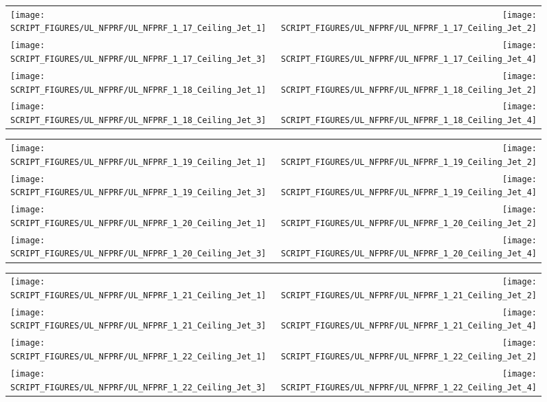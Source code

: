 \begin{figure}[!ht]
\begin{tabular*}{\textwidth}{l@{\extracolsep{\fill}}r}
\texttt{[image: SCRIPT\_FIGURES/UL\_NFPRF/UL\_NFPRF\_1\_17\_Ceiling\_Jet\_1]} &
\texttt{[image: SCRIPT\_FIGURES/UL\_NFPRF/UL\_NFPRF\_1\_17\_Ceiling\_Jet\_2]} \\
\texttt{[image: SCRIPT\_FIGURES/UL\_NFPRF/UL\_NFPRF\_1\_17\_Ceiling\_Jet\_3]} &
\texttt{[image: SCRIPT\_FIGURES/UL\_NFPRF/UL\_NFPRF\_1\_17\_Ceiling\_Jet\_4]} \\
\texttt{[image: SCRIPT\_FIGURES/UL\_NFPRF/UL\_NFPRF\_1\_18\_Ceiling\_Jet\_1]} &
\texttt{[image: SCRIPT\_FIGURES/UL\_NFPRF/UL\_NFPRF\_1\_18\_Ceiling\_Jet\_2]} \\
\texttt{[image: SCRIPT\_FIGURES/UL\_NFPRF/UL\_NFPRF\_1\_18\_Ceiling\_Jet\_3]} &
\texttt{[image: SCRIPT\_FIGURES/UL\_NFPRF/UL\_NFPRF\_1\_18\_Ceiling\_Jet\_4]}
\end{tabular*}
\end{figure}

\begin{figure}[!ht]
\begin{tabular*}{\textwidth}{l@{\extracolsep{\fill}}r}
\texttt{[image: SCRIPT\_FIGURES/UL\_NFPRF/UL\_NFPRF\_1\_19\_Ceiling\_Jet\_1]} &
\texttt{[image: SCRIPT\_FIGURES/UL\_NFPRF/UL\_NFPRF\_1\_19\_Ceiling\_Jet\_2]} \\
\texttt{[image: SCRIPT\_FIGURES/UL\_NFPRF/UL\_NFPRF\_1\_19\_Ceiling\_Jet\_3]} &
\texttt{[image: SCRIPT\_FIGURES/UL\_NFPRF/UL\_NFPRF\_1\_19\_Ceiling\_Jet\_4]} \\
\texttt{[image: SCRIPT\_FIGURES/UL\_NFPRF/UL\_NFPRF\_1\_20\_Ceiling\_Jet\_1]} &
\texttt{[image: SCRIPT\_FIGURES/UL\_NFPRF/UL\_NFPRF\_1\_20\_Ceiling\_Jet\_2]} \\
\texttt{[image: SCRIPT\_FIGURES/UL\_NFPRF/UL\_NFPRF\_1\_20\_Ceiling\_Jet\_3]} &
\texttt{[image: SCRIPT\_FIGURES/UL\_NFPRF/UL\_NFPRF\_1\_20\_Ceiling\_Jet\_4]}
\end{tabular*}
\end{figure}

\begin{figure}[!ht]
\begin{tabular*}{\textwidth}{l@{\extracolsep{\fill}}r}
\texttt{[image: SCRIPT\_FIGURES/UL\_NFPRF/UL\_NFPRF\_1\_21\_Ceiling\_Jet\_1]} &
\texttt{[image: SCRIPT\_FIGURES/UL\_NFPRF/UL\_NFPRF\_1\_21\_Ceiling\_Jet\_2]} \\
\texttt{[image: SCRIPT\_FIGURES/UL\_NFPRF/UL\_NFPRF\_1\_21\_Ceiling\_Jet\_3]} &
\texttt{[image: SCRIPT\_FIGURES/UL\_NFPRF/UL\_NFPRF\_1\_21\_Ceiling\_Jet\_4]} \\
\texttt{[image: SCRIPT\_FIGURES/UL\_NFPRF/UL\_NFPRF\_1\_22\_Ceiling\_Jet\_1]} &
\texttt{[image: SCRIPT\_FIGURES/UL\_NFPRF/UL\_NFPRF\_1\_22\_Ceiling\_Jet\_2]} \\
\texttt{[image: SCRIPT\_FIGURES/UL\_NFPRF/UL\_NFPRF\_1\_22\_Ceiling\_Jet\_3]} &
\texttt{[image: SCRIPT\_FIGURES/UL\_NFPRF/UL\_NFPRF\_1\_22\_Ceiling\_Jet\_4]}
\end{tabular*}
\end{figure}

